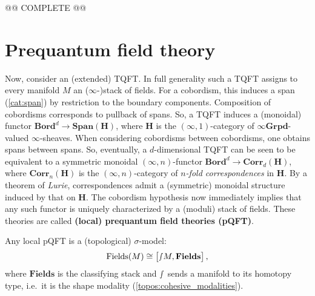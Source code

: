    @@ COMPLETE @@

\section{Prequantum field theory}

    Now, consider an (extended) TQFT. In full generality such a TQFT assigns to every manifold $M$ an ($\infty$-)stack of fields. For a cobordism, this induces a span (\cref{cat:span}) by restriction to the boundary components. Composition of cobordisms corresponds to pullback of spans. So, a TQFT induces a (monoidal) functor $\mathbf{Bord}^d\rightarrow\mathbf{Span}(\mathbf{H})$, where $\mathbf{H}$ is the $(\infty,1)$-category of $\infty\mathbf{Grpd}$-valued $\infty$-sheaves. When considering cobordisms between cobordisms, one obtains spans between spans. So, eventually, a $d$-dimensional TQFT can be seen to be equivalent to a symmetric monoidal $(\infty,n)$-functor $\mathbf{Bord}^d\rightarrow\mathbf{Corr}_d(\mathbf{H})$, where $\mathbf{Corr}_n(\mathbf{H})$ is the $(\infty,n)$-category of \textit{$n$-fold correspondences} in $\mathbf{H}$. By a theorem of \textit{Lurie}, correspondences admit a (symmetric) monoidal structure induced by that on $\mathbf{H}$. The cobordism hypothesis now immediately implies that any such functor is uniquely characterized by a (moduli) stack of fields. These theories are called \textbf{(local) prequantum field theories (pQFT)}.

    \begin{property}
        Any local pQFT is a (topological) $\sigma$-model:
        \begin{gather}
            \mathrm{Fields}(M)\cong\bigl[\smallint\!M,\mathbf{Fields}\bigr]\,,
        \end{gather}
        where $\mathbf{Fields}$ is the classifying stack and $\smallint$ sends a manifold to its homotopy type, i.e.~it is the shape modality (\cref{topos:cohesive_modalities}).
    \end{property}

